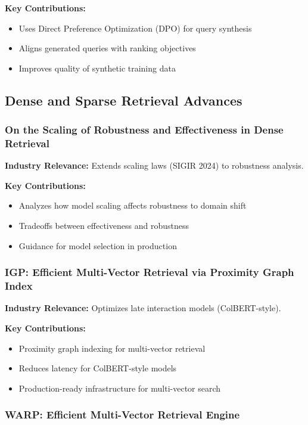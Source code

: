 \documentclass[11pt,letterpaper]{article}
\begin{document}
\textbf{Key Contributions:}
\begin{itemize}[leftmargin=*]
    \item Uses Direct Preference Optimization (DPO) for query synthesis
    \item Aligns generated queries with ranking objectives
    \item Improves quality of synthetic training data
\end{itemize}

\subsection{Dense and Sparse Retrieval Advances}

\subsubsection{On the Scaling of Robustness and Effectiveness in Dense Retrieval}

\textbf{Industry Relevance:} Extends scaling laws (SIGIR 2024) to robustness analysis.

\textbf{Key Contributions:}
\begin{itemize}[leftmargin=*]
    \item Analyzes how model scaling affects robustness to domain shift
    \item Tradeoffs between effectiveness and robustness
    \item Guidance for model selection in production
\end{itemize}

\subsubsection{IGP: Efficient Multi-Vector Retrieval via Proximity Graph Index}

\textbf{Industry Relevance:} Optimizes late interaction models (ColBERT-style).

\textbf{Key Contributions:}
\begin{itemize}[leftmargin=*]
    \item Proximity graph indexing for multi-vector retrieval
    \item Reduces latency for ColBERT-style models
    \item Production-ready infrastructure for multi-vector search
\end{itemize}

\subsubsection{WARP: Efficient Multi-Vector Retrieval Engine}
\end{document}
